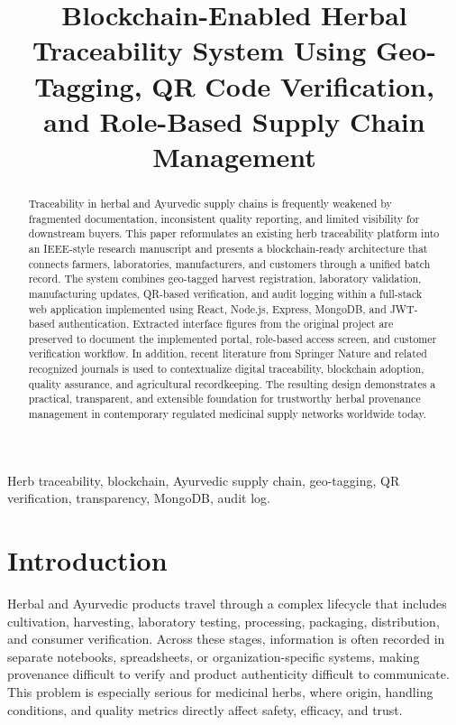 \documentclass[conference]{IEEEtran}
\title{Blockchain-Enabled Herbal Traceability System Using Geo-Tagging, QR Code Verification, and Role-Based Supply Chain Management}
\author{
\IEEEauthorblockN{Nikhil Sahu \and Devi S.}
\IEEEauthorblockA{School of Information Science\\
Presidency University\\
nikhilsahu8004@gmail.com, devi.s@presidencyuniversity.in}
}
\begin{document}
\maketitle

\begin{abstract}
Traceability in herbal and Ayurvedic supply chains is frequently weakened by fragmented documentation, inconsistent quality reporting, and limited visibility for downstream buyers. This paper reformulates an existing herb traceability platform into an IEEE-style research manuscript and presents a blockchain-ready architecture that connects farmers, laboratories, manufacturers, and customers through a unified batch record. The system combines geo-tagged harvest registration, laboratory validation, manufacturing updates, QR-based verification, and audit logging within a full-stack web application implemented using React, Node.js, Express, MongoDB, and JWT-based authentication. Extracted interface figures from the original project are preserved to document the implemented portal, role-based access screen, and customer verification workflow. In addition, recent literature from Springer Nature and related recognized journals is used to contextualize digital traceability, blockchain adoption, quality assurance, and agricultural recordkeeping. The resulting design demonstrates a practical, transparent, and extensible foundation for trustworthy herbal provenance management in contemporary regulated medicinal supply networks worldwide today.
\end{abstract}

\begin{IEEEkeywords}
Herb traceability, blockchain, Ayurvedic supply chain, geo-tagging, QR verification, transparency, MongoDB, audit log.
\end{IEEEkeywords}

\section{Introduction}

Herbal and Ayurvedic products travel through a complex lifecycle that includes cultivation, harvesting, laboratory testing, processing, packaging, distribution, and consumer verification. Across these stages, information is often recorded in separate notebooks, spreadsheets, or organization-specific systems, making provenance difficult to verify and product authenticity difficult to communicate. This problem is especially serious for medicinal herbs, where origin, handling conditions, and quality metrics directly affect safety, efficacy, and trust.
\end{document}
